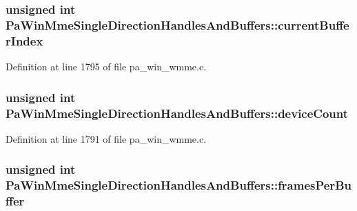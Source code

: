 \subsubsection[{\texorpdfstring{current\+Buffer\+Index}{currentBufferIndex}}]{\setlength{\rightskip}{0pt plus 5cm}unsigned {\bf int} Pa\+Win\+Mme\+Single\+Direction\+Handles\+And\+Buffers\+::current\+Buffer\+Index}\hypertarget{struct_pa_win_mme_single_direction_handles_and_buffers_a8e111457cd124abc104ad6ccd4345211}{}\label{struct_pa_win_mme_single_direction_handles_and_buffers_a8e111457cd124abc104ad6ccd4345211}


Definition at line 1795 of file pa\+\_\+win\+\_\+wmme.\+c.

\subsubsection[{\texorpdfstring{device\+Count}{deviceCount}}]{\setlength{\rightskip}{0pt plus 5cm}unsigned {\bf int} Pa\+Win\+Mme\+Single\+Direction\+Handles\+And\+Buffers\+::device\+Count}\hypertarget{struct_pa_win_mme_single_direction_handles_and_buffers_a8bc9a78d4eee86140c8c1b6114cc015a}{}\label{struct_pa_win_mme_single_direction_handles_and_buffers_a8bc9a78d4eee86140c8c1b6114cc015a}


Definition at line 1791 of file pa\+\_\+win\+\_\+wmme.\+c.

\subsubsection[{\texorpdfstring{frames\+Per\+Buffer}{framesPerBuffer}}]{\setlength{\rightskip}{0pt plus 5cm}unsigned {\bf int} Pa\+Win\+Mme\+Single\+Direction\+Handles\+And\+Buffers\+::frames\+Per\+Buffer}\hypertarget{struct_pa_win_mme_single_direction_handles_and_buffers_ad031742efc4c45f1f420ca6b2ed33771}{}\label{struct_pa_win_mme_single_direction_handles_and_buffers_ad031742efc4c45f1f420ca6b2ed33771}


